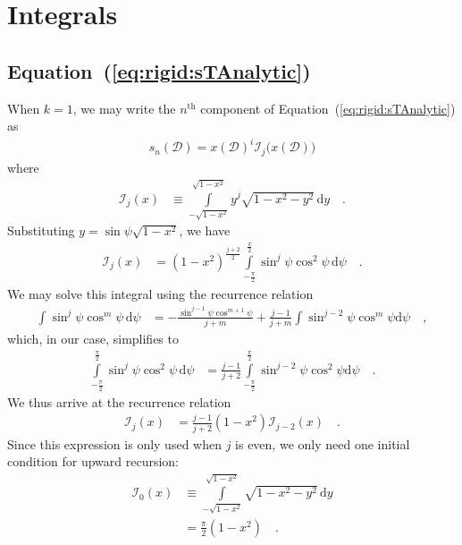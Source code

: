 \documentclass[modern]{aastex62}
\begin{document}
%
%
%
%
\appendix
%
%
%
%

\section{Integrals}
\subsection{Equation~(\ref{eq:rigid:sTAnalytic})}
%
When $k = 1$, we may write the $n^\mathrm{th}$ component
of Equation~(\ref{eq:rigid:sTAnalytic}) as
%
\begin{align}
    s_n(\mathcal{D}) = 
        x(\mathcal{D})^{i}
        \mathcal{I}_{j}\big(x(\mathcal{D})\big)
\end{align}
%
where
%
\begin{align}
    \mathcal{I}_j(x) &\equiv
    \int\limits_{-\sqrt{1-x^2}}^{\sqrt{1-x^2}}
        y^{j}
        \sqrt{1 - x^2 - y^2} \,
    \mathrm{d}y
    \quad.
\end{align}
%
Substituting $y = \sin\psi\sqrt{1 - x^2}$, we have
%
\begin{align}
    \mathcal{I}_j(x) &=
    (1 - x^2)^{\frac{j + 2}{2}}
    \int\limits_{-\frac{\pi}{2}}^{\frac{\pi}{2}}
        \sin^j\psi
        \cos^2\psi \,
    \mathrm{d}\psi
    \quad.
\end{align}
%
We may solve this integral using the recurrence relation
%
\begin{align}
    \int
        \sin^j\psi
        \cos^m\psi \,
    \mathrm{d}\psi
    &=
    -\frac{\sin^{j-1}\psi \cos^{m+1}\psi}{j + m}
    +
    \frac{j - 1}{j + m}\int\sin^{j-2}\psi \cos^m\psi \mathrm{d}\psi
    \quad ,
\end{align}
%
which, in our case, simplifies to
%
\begin{align}
    \int\limits_{-\frac{\pi}{2}}^{\frac{\pi}{2}}
        \sin^j\psi
        \cos^2\psi \,
    \mathrm{d}\psi
    &=
    \frac{j - 1}{j + 2}\int\limits_{-\frac{\pi}{2}}^
        {\frac{\pi}{2}}\sin^{j-2}\psi \cos^2\psi \mathrm{d}\psi
    \quad.
\end{align}
%
We thus arrive at the recurrence relation
%
\begin{align}
    \label{eq:app:Ij}
    \mathcal{I}_j(x) &=
    \frac{j - 1}{j + 2}
    (1 - x^2)
    \mathcal{I}_{j-2}(x)
    \quad.
\end{align}
%
Since this expression is only used when $j$ is even, we only need one
initial condition for upward recursion:
%
\begin{align}
    \label{eq:app:I0}
    \mathcal{I}_0(x) &\equiv
    \int\limits_{-\sqrt{1-x^2}}^{\sqrt{1-x^2}}
        \sqrt{1 - x^2 - y^2} \,
    \mathrm{d}y
    \nonumber \\
    &= \frac{\pi}{2}(1 - x^2)
    \quad.
\end{align}


\end{document}
